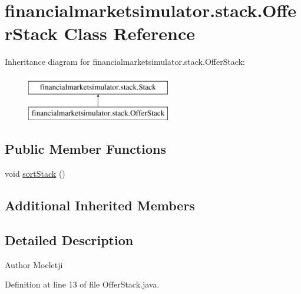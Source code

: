 \hypertarget{classfinancialmarketsimulator_1_1stack_1_1_offer_stack}{\section{financialmarketsimulator.\+stack.\+Offer\+Stack Class Reference}
\label{classfinancialmarketsimulator_1_1stack_1_1_offer_stack}
}
Inheritance diagram for financialmarketsimulator.\+stack.\+Offer\+Stack\+:\begin{figure}[H]
\begin{center}
\leavevmode
\includegraphics[height=2.000000cm]{classfinancialmarketsimulator_1_1stack_1_1_offer_stack}
\end{center}
\end{figure}
\subsection*{Public Member Functions}
\begin{DoxyCompactItemize}
\item 
void \hyperlink{classfinancialmarketsimulator_1_1stack_1_1_offer_stack_a34bc18d02e364310b528b9a40f58d16f}{sort\+Stack} ()
\end{DoxyCompactItemize}
\subsection*{Additional Inherited Members}


\subsection{Detailed Description}
\begin{DoxyAuthor}{Author}
Moeletji 
\end{DoxyAuthor}


Definition at line 13 of file Offer\+Stack.\+java.



